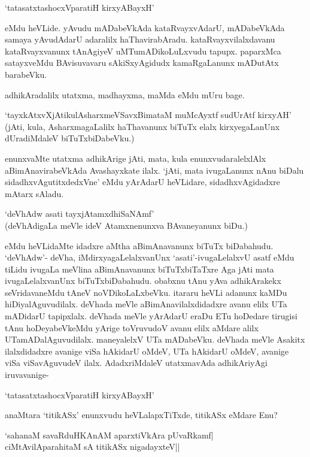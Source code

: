 \begin{shloka}
`tatasatxtashocxVparatiH kirxyABayxH'
\end{shloka}

\noindent eMdu heVLide. yAvudu mADabeVkAda kataRvayxvAdarU, mADabeVkAda samaya yAvudAdarU adaralilx haThavirabAradu. kataRvayxvilalxdavanu kataRvayxvanunx tAnAgiyeV uMTumADikoLuLxvudu tapupx. paparxMca satayxveMdu BAvisuvavaru sAkiSxyAgidudx kamaRgaLanunx mADutAtx barabeVku.

adhikAradalilx utatxma, madhayxma, maMda eMdu mUru bage.

`tayxkAtxvXjAtikulAsharxmeVSavxBimataM muMcAyxtf sudUrAtf kirxyAH' (jAti, kula, AsharxmagaLalilx haThavanunx biTuTx elalx kirxyegaLanUnx dUradiMdaleV biTuTxbiDabeVku.)

enunxvaMte utatxma adhikArige jAti, mata, kula enunxvudaralelxlAlx aBimAnavirabeVkAda Avashayxkate ilalx. `jAti, mata ivugaLanunx nAnu biDalu sidadhxvAgutitxdedxVne' eMdu yArAdarU heVLidare, sidadhxvAgidadxre mAtarx sAladu.

\begin{shloka}
`deVhAdw asati tayxjAtamxdhiSaNAmf'\\
(deVhAdigaLa meVle ideV Atamxnenunxva BAvaneyanunx biDu.)
\end{shloka}

\noindent eMdu heVLidaMte idadxre aMtha aBimAnavanunx biTuTx biDabahudu. `deVhAdw'- deVha, iMdirxyagaLelalxvanUnx `asati'-ivugaLelalxvU asatf eMdu tiLidu ivugaLa meVlina aBimAnavanunx biTuTxbiTaTxre Aga jAti mata ivugaLelalxvanUnx biTuTxbiDabahudu. obabxnu tAnu yAva adhikArakekx seVridavaneMdu tAneV noVDikoLaLxbeVku. itararu heVLi adanunx kaMDu hiDiyalAguvudilalx. deVhada meVle aBimAnavilalxdidadxre avanu elilx UTa mADidarU tapipxlalx. deVhada meVle yArAdarU eraDu ETu hoDedare tirugisi tAnu hoDeyabeVkeMdu yArige toVruvudoV avanu elilx aMdare alilx UTamADalAguvudilalx. maneyalelxV UTa mADabeVku. deVhada meVle Asakitx ilalxdidadxre avanige viSa hAkidarU oMdeV, UTa hAkidarU oMdeV, avanige viSa viSavAguvudeV ilalx. AdadxriMdaleV utatxmavAda adhikAriyAgi iruvavanige- 

\begin{shloka}
`tatasatxtashocxVparatiH kirxyABayxH'
\end{shloka}

anaMtara `titikASx' enunxvudu heVLalapxTiTxde, titikASx eMdare Enu?

\begin{shloka}
`sahanaM savaRduHKAnAM aparxtiVkAra pUvaRkamf|\\
ciMtAvilAparahitaM sA titikASx nigadayxteV||
\end{shloka}


